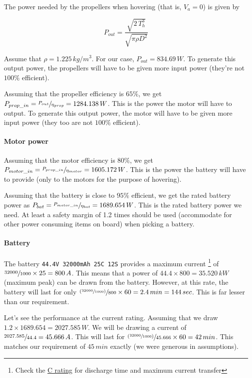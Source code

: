 The power needed by the propellers when hovering (that is, $V_a = 0$) is given by

\begin{equation}
    P_{out} = \frac{\sqrt{2\,T_h^3}}{\sqrt{\pi \rho D^2}}
\end{equation}

Assume that $\rho = 1.225\,kg/m^3$. For our case, $P_{out} = 834.69\,W$. To generate this output power, the propellers will have to be given more input power (they're not $100\%$ efficient).

Assuming that the propeller efficiency is $65\%$, we get $P_{prop\_in} = \sfrac{P_{out}}{\eta_{prop}} = 1284.138\,W$. This is the power the motor will have to output. To generate this output power, the motor will have to be given more input power (they too are not $100\%$ efficient).

\paragraph*{Motor power}

Assuming that the motor efficiency is $80\%$, we get $P_{motor\_in} = \sfrac{P_{prop\_in}}{\eta_{motor}} = 1605.172\,W$. This is the power the battery will have to provide (only to the motors for the purpose of hovering).

Assuming that the battery is close to $95\%$ efficient, we get the rated battery power as $P_{bat} = \sfrac{P_{motor\_in}}{\eta_{bat}} = 1689.654\,W$. This is the rated battery power we need. At least a safety margin of 1.2 times should be used (accommodate for other power consuming items on board) when picking a battery.

\paragraph*{Battery}

The battery \texttt{44.4V 32000mAh 25C 12S} provides a maximum current
\footnote{Check the \href{https://www.power-sonic.com/blog/what-is-a-battery-c-rating/}{C rating} for discharge time and maximum current transfer}
of $\sfrac{32000}{1000} \times 25 = 800\,A$. This means that a power of $44.4 \times 800 = 35.520\,kW$ (maximum peak) can be drawn from the battery. However, at this rate, the battery will last for only $\sfrac{(\sfrac{32000}{1000})}{800}\times60 = 2.4\,min = 144\,sec$. This is far lesser than our requirement. 

Let's see the performance at the current rating. Assuming that we draw $1.2\times1689.654 = 2027.585\,W$. We will be drawing a current of $\sfrac{2027.585}{44.4} = 45.666\,A$. This will last for $\sfrac{(\sfrac{32000}{1000})}{45.666}\times60 = 42\,min$. This matches our requirement of $45\,min$ exactly (we were generous in assumptions).


